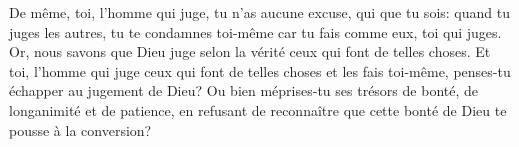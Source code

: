 De même, toi, l’homme qui juge, tu n’as aucune excuse, qui que tu sois:
	quand tu juges les autres, tu te condamnes toi-même
	car tu fais comme eux, toi qui juges.
Or, nous savons que Dieu juge selon la vérité ceux qui font de telles choses.
Et toi, l’homme qui juge ceux qui font de telles choses et les fais toi-même,
	penses-tu échapper au jugement de Dieu?
Ou bien méprises-tu ses trésors de bonté, de longanimité et de patience,
	en refusant de reconnaître
		que cette bonté de Dieu te pousse à la conversion?
